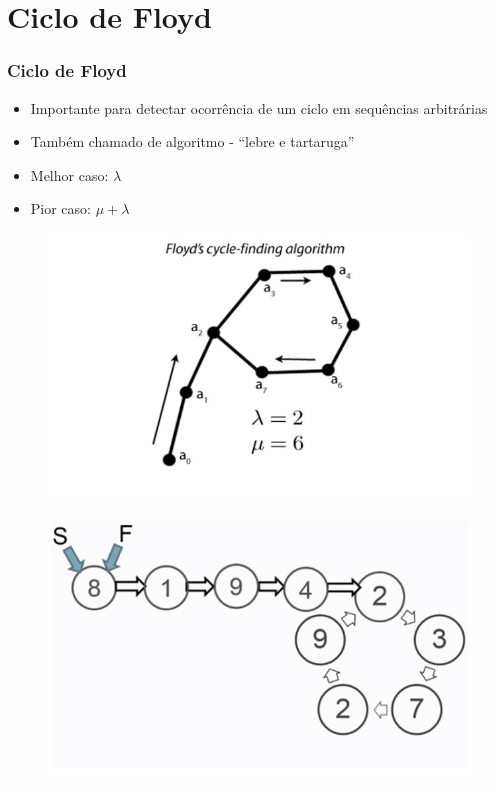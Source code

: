 \documentclass{beamer}
\begin{document}
\section{Ciclo de Floyd}
\begin{frame}
\frametitle{Ciclo de Floyd}
  \begin{itemize}
    \item Importante para detectar ocorrência de um ciclo em sequências arbitrárias
    \item Também chamado de algoritmo - ``lebre e tartaruga''
    \item Melhor caso: $\lambda$
    \item Pior caso: $\mu + \lambda$
  \end{itemize}

  \begin{figure}
    \includegraphics[scale=0.2]{floyd_cycle}
  \end{figure}
\end{frame}
\begin{frame}
  \begin{figure}
    \includegraphics[scale=0.3]{floyd_step1}
  \end{figure}
\end{frame}
\end{document}
